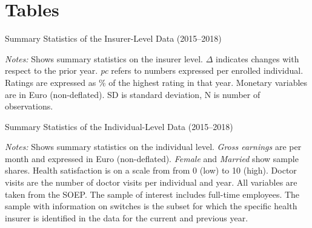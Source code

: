 \documentclass[a4paper, 11pt, english]{article}
\begin{document}
\clearpage 
\newpage 
\section*{Tables}

\begin{table}[ht]
	\caption{Summary Statistics of the Insurer-Level Data (2015--2018)}
	\label{tab:gkvsumjoint}
	\begin{adjustbox}{width=\textwidth}
		
	\end{adjustbox}
	\begin{minipage}{\textwidth}
		\small \vspace{0.2em}
		\textit{Notes:} Shows summary statistics on the insurer level. $\Delta$ indicates changes with respect to the prior year. \textit{pc} refers to numbers expressed per enrolled individual. Ratings are expressed as \% of the highest rating in that year. Monetary variables are in Euro (non-deflated). SD is standard deviation, N is number of observations.
	\end{minipage}
\end{table}

\vspace{3em}

\begin{table}[h!]
	\caption{Summary Statistics of the Individual-Level Data (2015--2018)}
	\label{tab:soepsummary}
		
	\begin{minipage}{\textwidth}
		\vspace{3pt}
		\small \textit{Notes:} Shows summary statistics on the individual level. \textit{Gross earnings} are per month and expressed in Euro (non-deflated). \textit{Female} and \textit{Married} show sample shares. Health satisfaction is on a scale from from 0 (low) to 10 (high). Doctor visits are the number of doctor visits per individual and year. All variables are taken from the SOEP. The sample of interest includes full-time employees. The sample with information on switches is the subset for which the specific health insurer is identified in the data for the current and previous year.
	\end{minipage}
\end{table}
\end{document}
